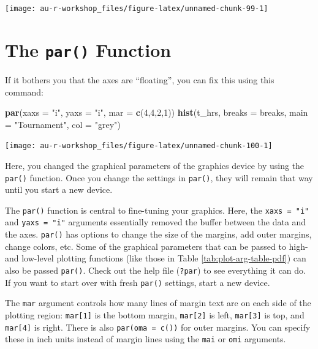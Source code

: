 \documentclass[]{book}
\newenvironment{Shaded}{\begin{snugshade}}{\end{snugshade}}
\newcommand{\KeywordTok}[1]{\textcolor[rgb]{0.13,0.29,0.53}{\textbf{#1}}}
\newcommand{\DataTypeTok}[1]{\textcolor[rgb]{0.13,0.29,0.53}{#1}}
\newcommand{\DecValTok}[1]{\textcolor[rgb]{0.00,0.00,0.81}{#1}}
\newcommand{\StringTok}[1]{\textcolor[rgb]{0.31,0.60,0.02}{#1}}
\newcommand{\NormalTok}[1]{#1}
\theoremstyle{definition}
\theoremstyle{definition}
\theoremstyle{definition}
\theoremstyle{remark}
\begin{document}
\begin{center}\texttt{[image: au-r-workshop\_files/figure-latex/unnamed-chunk-99-1]} \end{center}

\section{\texorpdfstring{The \texttt{par()}
Function}{The par() Function}}\label{the-par-function}

If it bothers you that the axes are ``floating'', you can fix this using
this command:

\begin{Shaded}
\begin{Highlighting}[]
\KeywordTok{par}\NormalTok{(}\DataTypeTok{xaxs =} \StringTok{"i"}\NormalTok{, }\DataTypeTok{yaxs =} \StringTok{"i"}\NormalTok{, }\DataTypeTok{mar =} \KeywordTok{c}\NormalTok{(}\DecValTok{4}\NormalTok{,}\DecValTok{4}\NormalTok{,}\DecValTok{2}\NormalTok{,}\DecValTok{1}\NormalTok{))}
\KeywordTok{hist}\NormalTok{(t_hrs, }\DataTypeTok{breaks =}\NormalTok{ breaks, }\DataTypeTok{main =} \StringTok{"Tournament"}\NormalTok{, }\DataTypeTok{col =} \StringTok{"grey"}\NormalTok{)}
\end{Highlighting}
\end{Shaded}

\begin{center}\texttt{[image: au-r-workshop\_files/figure-latex/unnamed-chunk-100-1]} \end{center}

Here, you changed the graphical parameters of the graphics device by
using the \texttt{par()} function. Once you change the settings in
\texttt{par()}, they will remain that way until you start a new device.

The \texttt{par()} function is central to fine-tuning your graphics.
Here, the \texttt{xaxs\ =\ "i"} and \texttt{yaxs\ =\ "i"} arguments
essentially removed the buffer between the data and the axes.
\texttt{par()} has options to change the size of the margins, add outer
margins, change colors, etc. Some of the graphical parameters that can
be passed to high- and low-level plotting functions (like those in Table
\ref{tab:plot-arg-table-pdf}) can also be passed \texttt{par()}. Check
out the help file (\texttt{?par}) to see everything it can do. If you
want to start over with fresh \texttt{par()} settings, start a new
device.

The \texttt{mar} argument controls how many lines of margin text are on
each side of the plotting region: \texttt{mar{[}1{]}} is the bottom
margin, \texttt{mar{[}2{]}} is left, \texttt{mar{[}3{]}} is top, and
\texttt{mar{[}4{]}} is right. There is also \texttt{par(oma\ =\ c())}
for outer margins. You can specify these in inch units instead of margin
lines using the \texttt{mai} or \texttt{omi} arguments.
\end{document}

